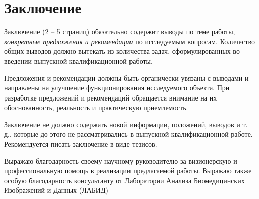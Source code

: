 \chapter*{Заключение} \label{ch-conclusion}

Заключение (2 -- 5 страниц) обязательно содержит выводы по теме работы, \textit{конкретные
предложения и рекомендации} по исследуемым вопросам. Количество общих выводов
должно вытекать из количества задач, сформулированных во введении выпускной
квалификационной работы.

Предложения и рекомендации должны быть органически увязаны с выводами
и направлены на улучшение функционирования исследуемого объекта. При разработке
предложений и рекомендаций обращается внимание на их обоснованность,
реальность и практическую приемлемость.

Заключение не должно содержать новой информации, положений, выводов и
т. д., которые до этого не рассматривались в выпускной квалификационной работе.
Рекомендуется писать заключение в виде тезисов.

Выражаю благодарность своему научному руководителю за визионерскую и профессиональную помощь
в реализации предлагаемой работы. Выражаю также особую благодарность консультанту от 
Лаборатории Анализа Биомедицинских Изображений и Данных (ЛАБИД)

